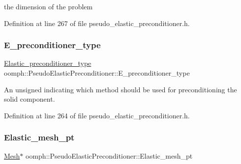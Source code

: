 the dimension of the problem 



Definition at line 267 of file pseudo\+\_\+elastic\+\_\+preconditioner.\+h.

\mbox{\label{classoomph_1_1PseudoElasticPreconditioner_abb84100d37f174e683b2d7a0dd688584}} 
\subsubsection{\texorpdfstring{E\+\_\+preconditioner\+\_\+type}{E\_preconditioner\_type}}
{\footnotesize\ttfamily \hyperlink{classoomph_1_1PseudoElasticPreconditioner_acde733e1a111a961d1e714add4e8015d}{Elastic\+\_\+preconditioner\+\_\+type} oomph\+::\+Pseudo\+Elastic\+Preconditioner\+::\+E\+\_\+preconditioner\+\_\+type\hspace{0.3cm}{\ttfamily [private]}}



An unsigned indicating which method should be used for preconditioning the solid component. 



Definition at line 264 of file pseudo\+\_\+elastic\+\_\+preconditioner.\+h.

\mbox{\label{classoomph_1_1PseudoElasticPreconditioner_aba765545c62b9dc52f7c2ea25ea13177}} 
\subsubsection{\texorpdfstring{Elastic\+\_\+mesh\+\_\+pt}{Elastic\_mesh\_pt}}
{\footnotesize\ttfamily \hyperlink{classoomph_1_1Mesh}{Mesh}$\ast$ oomph\+::\+Pseudo\+Elastic\+Preconditioner\+::\+Elastic\+\_\+mesh\+\_\+pt\hspace{0.3cm}{\ttfamily [private]}}



